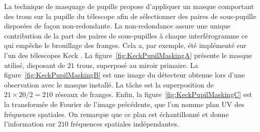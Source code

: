 La technique de masquage de pupille \citep{baldwin1986, haniff1987} propose d'appliquer un masque comportant des trous sur la pupille du télescope afin de sélectionner des paires de sous-pupille disposées de façon non-redondante. La non-redondance assure une unique contribution de la part des paires de sous-pupilles à chaque interférogramme ce qui empêche le brouillage des franges. Cela a, par exemple, été implémenté sur l'un des télescopes Keck \citep{tuthill2000}. La figure~\ref{fig:KeckPupilMaskingA} présente le masque utilisé, disposant de $21$ trous, superposé au miroir primaire. La figure~\ref{fig:KeckPupilMaskingB} est une image du détecteur obtenue lors d'une observation avec le masque installé. La tâche est la superposition de $21 \times 20 / 2 = 210$ réseaux de franges. Enfin, la figure~\ref{fig:KeckPupilMaskingC} est la transformée de Fourier de l'image précédente, que l'on nomme plan UV des fréquences spatiales. On remarque que ce plan est échantillonné et donne l'information sur $210$ fréquences spatiales indépendantes.

